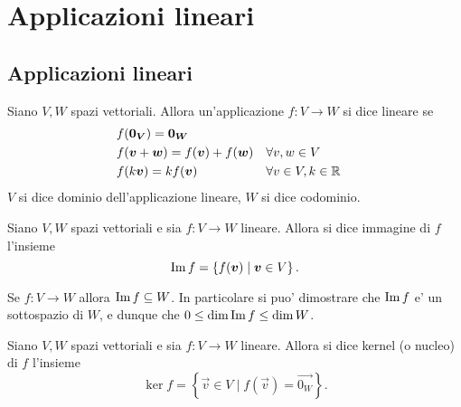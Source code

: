 \chapter{Applicazioni lineari}

\section{Applicazioni lineari}

\begin{definition}
    Siano $V, W$ spazi vettoriali. Allora un'applicazione $f : V \to W$ si dice lineare
    se
    \begin{align}
        &f(\bm{0_V}) = \bm{0_W} \\
        &f(\bm{v} + \bm{w}) = f(\bm{v}) + f(\bm{w}) &&\forall v, w \in V \\
        &f(k\bm{v}) = kf(\bm{v})                    &&\forall v\in V, k \in \mathbb{R} 
    \end{align}
    $V$ si dice dominio dell'applicazione lineare, $W$ si dice codominio.
\end{definition}

\begin{definition}
    Siano $V, W$ spazi vettoriali e sia $f : V \to W$ lineare. Allora si dice immagine di $f$ l'insieme \begin{equation}
        \operatorname{Im}f = \left\{ f(\bm{v}) \mid \bm{v} \in V\right\}.
    \end{equation}
\end{definition}

\begin{remark}
    Se $f : V \to W$ allora $\operatorname{Im}f \subseteq W$. In particolare si puo' dimostrare che $\operatorname{Im}f$ e' un sottospazio di $W$, e dunque che $0 \leq \dim\operatorname{Im}f \leq \dim W$.
\end{remark}

\begin{definition}
    Siano $V, W$ spazi vettoriali e sia $f : V \to W$ lineare. Allora si dice kernel (o nucleo) di $f$ l'insieme \begin{equation}
        \ker{f} = \left\{ \vec{v} \in V \mid f(\vec v) = \vec{0_W}\right\}.
    \end{equation}
\end{definition}


